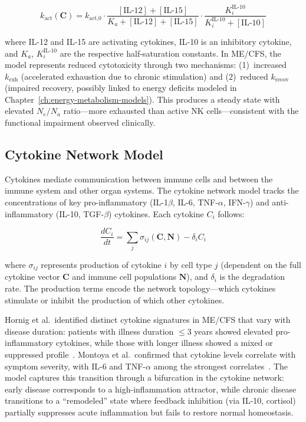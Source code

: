 \begin{equation}
\label{eq:nk-activation}
k_{\text{act}}(\boldsymbol{C}) = k_{\text{act,0}} \cdot \frac{[\text{IL-12}] + [\text{IL-15}]}{K_a + [\text{IL-12}] + [\text{IL-15}]} \cdot \frac{K_i^{\text{IL-10}}}{K_i^{\text{IL-10}} + [\text{IL-10}]}
\end{equation}

where IL-12 and IL-15 are activating cytokines, IL-10 is an inhibitory cytokine, and $K_a$, $K_i^{\text{IL-10}}$ are the respective half-saturation constants. In ME/CFS, the model represents reduced cytotoxicity through two mechanisms: (1)~increased $k_{\text{exh}}$ (accelerated exhaustion due to chronic stimulation) and (2)~reduced $k_{\text{recov}}$ (impaired recovery, possibly linked to energy deficits modeled in Chapter~\ref{ch:energy-metabolism-models}). This produces a steady state with elevated $N_e/N_a$ ratio---more exhausted than active NK cells---consistent with the functional impairment observed clinically.

\subsection{Cytokine Network Model}
\label{sec:cytokine-model}

Cytokines mediate communication between immune cells and between the immune system and other organ systems. The cytokine network model tracks the concentrations of key pro-inflammatory (IL-1$\beta$, IL-6, TNF-$\alpha$, IFN-$\gamma$) and anti-inflammatory (IL-10, TGF-$\beta$) cytokines. Each cytokine $C_i$ follows:

\begin{equation}
\label{eq:cytokine-general}
\frac{d C_i}{dt} = \sum_{j} \sigma_{ij}(\boldsymbol{C}, \boldsymbol{N}) - \delta_i C_i
\end{equation}

where $\sigma_{ij}$ represents production of cytokine $i$ by cell type $j$ (dependent on the full cytokine vector $\boldsymbol{C}$ and immune cell populations $\boldsymbol{N}$), and $\delta_i$ is the degradation rate. The production terms encode the network topology---which cytokines stimulate or inhibit the production of which other cytokines.

Hornig et al.\ identified distinct cytokine signatures in ME/CFS that vary with disease duration: patients with illness duration $\leq 3$ years showed elevated pro-inflammatory cytokines, while those with longer illness showed a mixed or suppressed profile~\cite{Hornig2015}. Montoya et al.\ confirmed that cytokine levels correlate with symptom severity, with IL-6 and TNF-$\alpha$ among the strongest correlates~\cite{Montoya2017}. The model captures this transition through a bifurcation in the cytokine network: early disease corresponds to a high-inflammation attractor, while chronic disease transitions to a ``remodeled'' state where feedback inhibition (via IL-10, cortisol) partially suppresses acute inflammation but fails to restore normal homeostasis.


